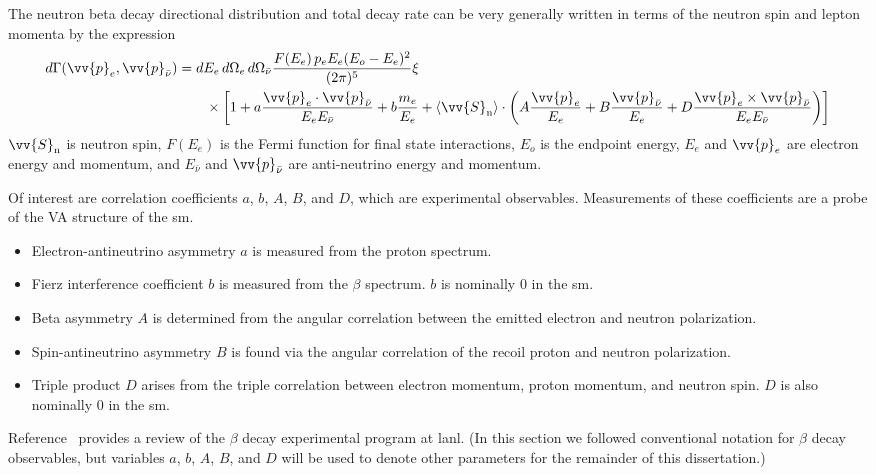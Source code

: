 The neutron beta decay directional distribution and total decay rate can be very generally written in terms of the neutron spin and lepton momenta by the expression~\cite{Young2014}
%
\begin{align}
    d\Gamma(\vv{p}_e, \vv{p}_{\bar{\nu}}) &= dE_e\,d\Omega_e \,d\Omega_{\bar{\nu}} \frac{F(E_e)\,p_e E_e (E_o-E_e)^2}{(2\pi)^5} \xi \nonumber \\
    &\quad\quad \times \left[1 + a\frac{\vv{p}_e \cdot \vv{p}_{\bar{\nu}}}{E_e E_{\bar{\nu}}}
    +b\frac{m_e}{E_e} + \langle \vv{S}_\text{n} \rangle \cdot
    \left( A\frac{\vv{p}_e}{E_e} + B \frac{\vv{p}_{\bar{\nu}}}{E_e} + D\frac{\vv{p}_e\times \vv{p}_{\bar{\nu}}}{E_e E_{\bar{\nu}}}
    \right) \right]
\end{align}
%
$\vv{S}_\text{n}$ is neutron spin, $F(E_e)$ is the Fermi function for final state interactions, $E_o$ is the endpoint energy, $E_e$ and $\vv{p}_e$ are electron energy and momentum, and $E_{\bar{\nu}}$ and $\vv{p}_{\bar{\nu}}$ are anti-neutrino energy and momentum.

Of interest are correlation coefficients $a$, $b$, $A$, $B$, and $D$, which are experimental observables. Measurements of these coefficients are a probe of the V\textendash A structure of the \acrshort{sm}. 
%
\begin{itemize}
    \item Electron-antineutrino asymmetry $a$ is measured from the proton spectrum.
    \item Fierz interference coefficient $b$ is measured from the $\beta$ spectrum. $b$ is nominally $0$ in the \acrshort*{sm}.
    \item Beta asymmetry $A$ is determined from the angular correlation between the emitted electron and neutron polarization.
    \item Spin-antineutrino asymmetry $B$ is found via the angular correlation of the recoil proton and neutron polarization.
    \item Triple product $D$ arises from the triple correlation between electron momentum, proton momentum, and neutron spin. $D$ is also nominally $0$ in the \acrshort*{sm}.
\end{itemize}

Reference~\cite{Young2014} provides a review of the $\beta$ decay experimental program at \acrshort{lanl}. (In this section we followed conventional notation for $\beta$ decay observables, but variables $a$, $b$, $A$, $B$, and $D$ will be used to denote other parameters for the remainder of this dissertation.) 


